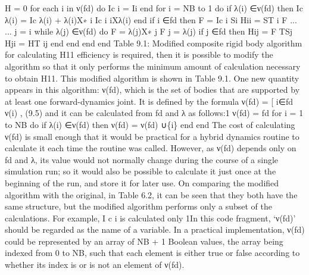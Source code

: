 H = 0 for each i in ν(fd) do Ic i = Ii end for i = NB to 1 do if λ(i) ∈ν(fd) then Ic λ(i) = Ic λ(i) + λ(i)X∗ i Ic i iXλ(i) end if i ∈fd then F = Ic i Si Hii = ST i F ... ... j = i while λ(j) ∈ν(fd) do F = λ(j)X∗ j F j = λ(j) if j ∈fd then Hij = F TSj Hji = HT ij end end end end Table 9.1: Modified composite rigid body algorithm for calculating H11 efficiency is required, then it is possible to modify the algorithm so that it only performs the minimum amount of calculation necessary to obtain H11. This modified algorithm is shown in Table 9.1. One new quantity appears in this algorithm: ν(fd), which is the set of bodies that are supported by at least one forward-dynamics joint. It is defined by the formula ν(fd) = [ i∈fd ν(i) , (9.5) and it can be calculated from fd and λ as follows:1 ν(fd) = fd for i = 1 to NB do if λ(i) ∈ν(fd) then ν(fd) = ν(fd) ∪\{i\} end end The cost of calculating ν(fd) is small enough that it would be practical for a hybrid dynamics routine to calculate it each time the routine was called. However, as ν(fd) depends only on fd and λ, its value would not normally change during the course of a single simulation run; so it would also be possible to calculate it just once at the beginning of the run, and store it for later use. On comparing the modified algorithm with the original, in Table 6.2, it can be seen that they both have the same structure, but the modified algorithm performs only a subset of the calculations. For example, I c i is calculated only 1In this code fragment, ‘ν(fd)’ should be regarded as the name of a variable. In a practical implementation, ν(fd) could be represented by an array of NB + 1 Boolean values, the array being indexed from 0 to NB, such that each element is either true or false according to whether its index is or is not an element of ν(fd).

